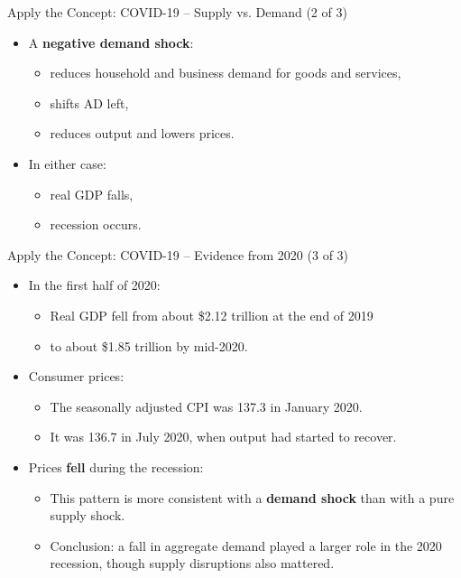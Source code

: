 \documentclass[aspectratio=169]{beamer}
\begin{document}
\begin{frame}{Apply the Concept: COVID-19 -- Supply vs. Demand (2 of 3)}
\transfade
\begin{itemize}
  \item A \textbf{negative demand shock}:
  \begin{itemize}
    \item reduces household and business demand for goods and services,
    \item shifts AD left,
    \item reduces output and lowers prices.
  \end{itemize}
  \item In either case:
  \begin{itemize}
    \item real GDP falls,
    \item recession occurs.
  \end{itemize}
\end{itemize}
\end{frame}

\begin{frame}{Apply the Concept: COVID-19 -- Evidence from 2020 (3 of 3)}
\transfade
\begin{itemize}
  \item In the first half of 2020:
  \begin{itemize}
    \item Real GDP fell from about \$2.12 trillion at the end of 2019
    \item to about \$1.85 trillion by mid-2020.
  \end{itemize}
  \item Consumer prices:
  \begin{itemize}
    \item The seasonally adjusted CPI was 137.3 in January 2020.
    \item It was 136.7 in July 2020, when output had started to recover.
  \end{itemize}
  \item Prices \textbf{fell} during the recession:
  \begin{itemize}
    \item This pattern is more consistent with a \textbf{demand shock} than with a pure supply shock.
    \item Conclusion: a fall in aggregate demand played a larger role in the 2020 recession, though supply disruptions also mattered.
  \end{itemize}
\end{itemize}
\end{frame}
\end{document}
